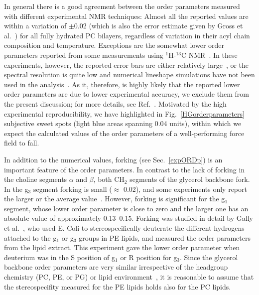 \documentclass[journal=jpcbfk,manuscript=article]{achemso}
\begin{document}
In general there is a good agreement between the order parameters measured with different experimental NMR techniques: Almost all the 
reported values are within a variation of $\pm$0.02 (which is also the error estimate given by Gross et al.~\cite{gross97}) 
for all fully hydrated PC bilayers, regardless of variation in their acyl chain composition and temperature.
Exceptions are the somewhat lower order parameters reported from some measurements using $^1$H-$^{13}$C NMR~\cite{hong95a,hong95b,warschawski05}.
In these experiments, however, the reported error bars are either relatively large~\cite{hong95a,hong95b}, 
or the spectral resolution is quite low and numerical lineshape simulations have not been used in the analysis~\cite{warschawski05}.
As it, therefore, is highly likely that the reported lower order parameters are due to lower experimental 
accuracy, we exclude them from the present discussion;
for more details, see Ref.~. 
Motivated by the high experimental reproducibility, we have highlighted in 
Fig.~\ref{HGorderparameters} subjective sweet spots (light blue areas spanning 0.04 units), within which we expect the calculated  
values of the order parameters of a well-performing force field to fall.

In addition to the numerical values, forking (see Sec.~\ref{expORDp}) is an important feature of the order parameters.
In contrast to the lack of forking in the choline segments $\alpha$ and $\beta$, both CH$_2$ segments of the glycerol backbone fork.
In the g$_3$ segment forking is small ($\approx$ 0.02), 
and some experiments only report the larger or the average value~\cite{akutsu81,ferreira13}. 
However, forking is significant for the g$_1$ segment, whose lower order parameter is close to zero and the
larger one has an absolute value of approximately 0.13--0.15. Forking was studied in detail by Gally et al.~\cite{gally81}, who used E. Coli to 
stereospecifically deuterate the different hydrogens attached to the g$_1$ or g$_3$ groups in PE lipids, and measured the order parameters from the lipid 
extract. This experiment gave the lower order parameter when deuterium was in the S position of g$_1$ or R position for g$_3$.
Since the glycerol backbone order parameters are very similar irrespective of the headgroup chemistry (PC, PE, or PG) or lipid 
environment~\cite{gally81}, it is reasonable to assume that the stereospecifity measured for the PE lipids
holds also for the PC lipids.
\end{document}
